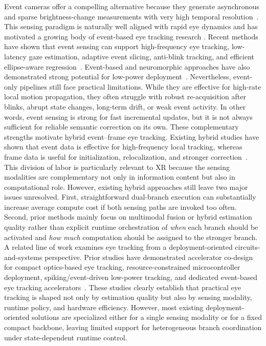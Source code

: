 \documentclass[journal]{IEEEtran}
\begin{document}
Event cameras offer a compelling alternative because they generate asynchronous and sparse brightness-change measurements with very high temporal resolution~\cite{lenero20113}. This sensing paradigm is naturally well aligned with rapid eye dynamics and has motivated a growing body of event-based eye tracking research \cite{wang2024event,chen2025event}. Recent methods have shown that event sensing can support high-frequency eye tracking, low-latency gaze estimation, adaptive event slicing, anti-blink tracking, and efficient ellipse-aware regression~\cite{chen20233et,li2023track,li2024gaze,sen2024eyetraes,zhang2024swift,ding2025facet}. Event-based and neuromorphic approaches have also demonstrated strong potential for low-power deployment~\cite{lai2026efficient,sui2026event,bonazzi2024retina}. Nevertheless, event-only pipelines still face practical limitations. While they are effective for high-rate local motion propagation, they often struggle with robust re-acquisition after blinks, abrupt state changes, long-term drift, or weak event activity. In other words, event sensing is strong for fast incremental updates, but it is not always sufficient for reliable semantic correction on its own.
%
These complementary strengths motivate hybrid event--frame eye tracking. Existing hybrid studies have shown that event data is effective for high-frequency local tracking, whereas frame data is useful for initialization, relocalization, and stronger correction~\cite{zhao2023ev,chen2025ex}. This division of labor is particularly relevant to XR because the sensing modalities are complementary not only in information content but also in computational role. However, existing hybrid approaches still leave two major issues unresolved. First, straightforward dual-branch execution can substantially increase average compute cost if both sensing paths are invoked too often. Second, prior methods mainly focus on multimodal fusion or hybrid estimation quality rather than explicit runtime orchestration of \emph{when} each branch should be activated and \emph{how much} computation should be assigned to the stronger branch.
%
A related line of work examines eye tracking from a deployment-oriented circuits-and-systems perspective. Prior studies have demonstrated accelerator co-design for compact optics-based eye tracking, resource-constrained microcontroller deployment, spiking/event-driven low-power tracking, and dedicated event-based eye tracking accelerators~\cite{you2022eyecod,bonazzi2024retina,giordano2025sub,han2026janeeye}. These studies clearly establish that practical eye tracking is shaped not only by estimation quality but also by sensing modality, runtime policy, and hardware efficiency. However, most existing deployment-oriented solutions are specialized either for a single sensing modality or for a fixed compact backbone, leaving limited support for heterogeneous branch coordination under state-dependent runtime control.
\end{document}
